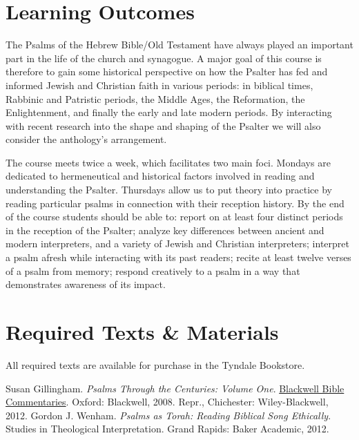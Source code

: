 \documentclass[titlepage]{article}
\newcommand\incl{../includes}
\begin{document}


\section{Learning Outcomes}
\label{outcomes}

The Psalms of the Hebrew Bible/Old Testament have always played an important
part in the life of the church and synagogue. A major goal of this course is
therefore to gain some historical perspective on how the Psalter has fed and
informed Jewish and Christian faith in various periods: in biblical times,
Rabbinic and Patristic periods, the Middle Ages, the Reformation, the
Enlightenment, and finally the early and late modern periods. By interacting
with recent research into the shape and shaping of the Psalter we will also
consider the anthology's arrangement.

The course meets twice a week, which facilitates two main foci. Mondays are
dedicated to hermeneutical and historical factors involved in reading and
understanding the Psalter. Thursdays allow us to put theory into practice by
reading particular psalms in connection with their reception history. By the
end of the course students should be able to: report on at least four distinct
periods in the reception of the Psalter; analyze key differences between
ancient and modern interpreters, and a variety of Jewish and Christian
interpreters; interpret a psalm afresh while interacting with its past
readers; recite at least twelve verses of a psalm from memory; respond
creatively to a psalm in a way that demonstrates awareness of its impact.

\section{Required Texts \& Materials}
\label{texts}

All required texts are available for purchase in the Tyndale Bookstore.

\begingroup
\renewcommand{\section}[2]{}%
\begin{thebibliography}{Gillingham}%
    Susan Gillingham. \emph{Psalms Through the Centuries: Volume One}.
    \href{http://bbibcomm.net/}{Blackwell Bible Commentaries}. Oxford:
    Blackwell, 2008. Repr., Chichester: Wiley-Blackwell, 2012.
    Gordon J. Wenham. \emph{Psalms as Torah: Reading Biblical Song
    Ethically}. Studies in Theological Interpretation. Grand Rapids:
    Baker Academic, 2012.
\end{thebibliography}
\endgroup
\end{document}
